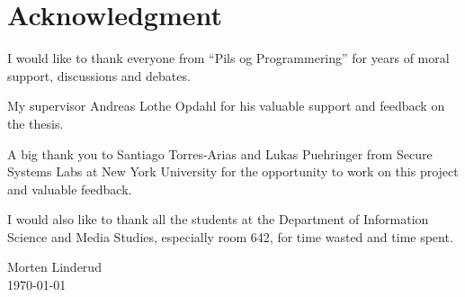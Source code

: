 \documentclass[../Main/thesis.tex]{subfiles}
\begin{document}
\chapter*{Acknowledgment}
I would like to thank everyone from ``Pils og Programmering'' for years of moral
support, discussions and debates.

My supervisor Andreas Lothe Opdahl for his valuable support and feedback on the
thesis.

A big thank you to Santiago Torres-Arias and Lukas Puehringer from Secure
Systems Labs at New York University for the opportunity to work on this project
and valuable feedback.

I would also like to thank all the students at the Department of Information
Science and Media Studies, especially room 642, for time wasted and time spent.


\begin{flushright}
Morten Linderud\\
\today
\end{flushright}

\blankpage
\end{document}
